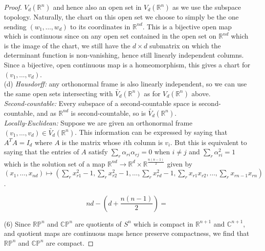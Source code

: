 \documentclass[reqno]{amsart}
\theoremstyle{definition}
\theoremstyle{remark}
\begin{document}
\begin{proof}
$V_d \left( \mathbb{R}^{n} \right) $ and hence
also an open set in $V_d \left( \mathbb{R}^{n} \right) $
as we use the subspace topology. 
Naturally, the chart on this
open set we choose to simply be
the one sending $\left( w_1, \ldots, w_d \right) $ to
its coordinates in $\mathbb{R}^{nd}$. This
is a bijective open map which is
continuous since on any open set contained
in the open set on $\mathbb{R}^{nd}$ which is
the image of the chart, we still have 
the $d\times d$ submatrix on which the determinant
function is non-vanishing, hence still linearly independent
columns. Since a bijective, open continuous map is a homeomorphism,
this gives a chart for
$\left( v_1, \ldots, v_d \right) $.\\
\linebreak
(d) \textit{Hausdorff:} any orthonormal frame
is also linearly independent, so we can use the same
open sets intersecting with
$\tilde{V_d}\left( \mathbb{R}^{n} \right) $ as for 
$V_d \left( \mathbb{R}^{n} \right) $ above.\\
\linebreak
\textit{Second-countable:} Every subspace of a second-countable
space is second-countable, and as $\mathbb{R}^{nd}$ is
second-countable, so is $\tilde{V_d}\left( \mathbb{R}^{n}
\right) $.\\
\linebreak
\textit{Locally-Euclidean:} 
Suppose we are given an orthonormal frame
$\left( v_1,\ldots, v_d \right) 
\in \tilde{V_d}\left( \mathbb{R}^{n} \right) $.
This information can be expressed by saying that
$A^{T} A = I_{d}$ where
$A$ is the matrix whose $i$th column is $v_i$. But this
is equivalent to saying that the entries of $A$ satisfy
$\sum_{r} \alpha_{ri} \alpha_{rj} = 0$ when
$i \neq j$ and
$\sum_{r} \alpha_{ri}^2 = 1$ which is the solution set
of a map
$\mathbb{R}^{nd} \to 
\mathbb{R}^{d} \times 
\mathbb{R}^{\frac{n \left( n-1 \right) }{2}}$ given by
$\left( x_1, \ldots,x_{nd} \right) \mapsto 
\left( \sum_{r} x_{r 1}^2 -1, 
\sum_{r} x_{r 2}^2 -1 ,\ldots,
\sum_{r} x_{r d}^2 - 1 ,
\sum_{r} x_{r 1} x_{r 2}, \ldots,
\sum_{r} x_{r n-1} x_{r n}\right) $.

\[
nd - \left( d + \frac{n(n-1)}{2} \right) 
= 
\] 

(6) Since  $\mathbb{R}\mathbb{P}^n$ and
$\mathbb{C}\mathbb{P}^{n}$ are quotients of
$S^{n}$ which is
compact in $\mathbb{R}^{n+1}$ and
$\mathbb{C}^{n+1}$, and quotient maps are continuous maps hence
preserve compactness, we find that
$\mathbb{R}\mathbb{P}^{n}$ and $\mathbb{C}\mathbb{P}^{n}$ 
are compact.


\end{proof}
\end{document}
